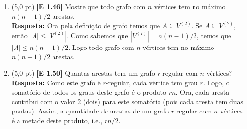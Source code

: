 \documentclass[12pt,a4paper,oneside]{article}
\begin{document}
\begin{enumerate}

	\item (5,0 pt) {\bf [E 1.46]} Mostre que todo grafo com $n$ vértices tem no máximo $n(n - 1)/2$ arestas.\\
	{ \color{blue} 
		{\bf Resposta:} Ora pela definição de grafo temos que $A \subseteq V^{(2)}$. Se $A \subseteq V^{(2)}$, então $|A| \leq |V^{(2)}|$. Como sabemos que $|V^{(2)}|=n(n-1)/2$, temos que $|A| \leq n(n-1)/2$. Logo todo grafo com $n$ vértices tem no máximo $n(n-1)/2$ arestas.
	}
	\item (5,0 pt) {\bf [E 1.50]} Quantas arestas tem um grafo $r$-regular com $n$ vértices?\\
	{ \color{blue} 
		{\bf Resposta:} Como este grafo é $r$-regular, cada vértice tem grau $r$. Logo, o somatório de todos os graus deste grafo é o produto $rn$. Ora, cada aresta contribui com o valor 2 (dois) para este somatório (pois cada aresta tem duas pontas). Assim, a quantidade de arestas de um grafo $r$-regular com $n$ vértices é a metade deste produto, i.e., $rn/2$.
	}
	
	\end{enumerate}
\end{document}
